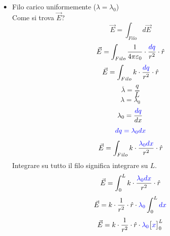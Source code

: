 \documentclass[twoside]{article}
\begin{document}
\begin{itemize}
    \item Filo carico uniformemente ($\lambda = \lambda_0$)\\
          Come si trova $\vec{E}$?
          \begin{equation*}
              \vec{E} = \displaystyle \int_{Filo} d \vec{E}
          \end{equation*}
          \begin{equation*}
              \vec{E} = \displaystyle \int_{Filo} \frac{1}{4\pi\varepsilon_0} \cdot \frac{\textcolor{blue}{dq}}{r^2} \cdot \hat{r}
          \end{equation*}
          \begin{equation*}
              \vec{E} = \displaystyle \int_{Filo} k \cdot \frac{\textcolor{blue}{dq}}{r^2} \cdot \hat{r}
          \end{equation*}
          \begin{equation*}
              \overline{\lambda} = \displaystyle \frac{q}{L}
          \end{equation*}
          \begin{equation*}
              \lambda = \lambda_0
          \end{equation*}
          \begin{equation*}
              \lambda_0 = \displaystyle \frac{\textcolor{blue}{dq}}{dx}
          \end{equation*}
          \begin{equation*}
              \textcolor{blue}{dq = \lambda_0 dx}
          \end{equation*}
          \begin{equation*}
              \vec{E} = \displaystyle \int_{Filo} k \cdot \frac{ \textcolor{blue}{\lambda_0 dx}}{r^2} \cdot \hat{r}
          \end{equation*}
          Integrare su tutto il filo significa integrare su $L$.
          \begin{equation*}
              \vec{E} = \displaystyle \int_{0}^{L} k \cdot \frac{ \textcolor{blue}{\lambda_0 dx}}{r^2} \cdot \hat{r}
          \end{equation*}
          \begin{equation*}
              \vec{E} = \displaystyle k \cdot  \frac{1}{r^2} \cdot \hat{r} \cdot \textcolor{blue}{\lambda_0} \int_{0}^{L} \textcolor{blue}{dx}
          \end{equation*}
          \begin{equation*}
              \vec{E} = \displaystyle k \cdot  \frac{1}{r^2} \cdot \hat{r} \cdot \textcolor{blue}{\lambda_0}  \big[ \textcolor{blue}{x}\big]_0^L

\end{equation*}
\end{itemize}
\end{document}
